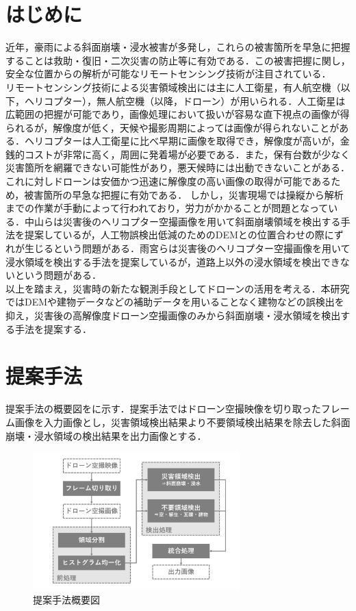 \documentclass[a4paper, twocolumn, xelatex, 8pt, ja=standard, Ligatures=TeX]{bxjsarticle}
\begin{document}
\section{はじめに}
	近年，豪雨による斜面崩壊・浸水被害が多発し，これらの被害箇所を早急に把握することは救助・復旧・二次災害の防止等に有効である．この被害把握に関し，安全な位置からの解析が可能なリモートセンシング技術が注目されている．\\
	\quad リモートセンシング技術による災害領域検出には主に人工衛星，有人航空機（以下，ヘリコプター），無人航空機（以降，ドローン）が用いられる．人工衛星は広範囲の把握が可能であり，画像処理において扱いが容易な直下視点の画像が得られるが，解像度が低く，天候や撮影周期によっては画像が得られないことがある．ヘリコプターは人工衛星に比べ早期に画像を取得でき，解像度が高いが，金銭的コストが非常に高く，周囲に発着場が必要である．また，保有台数が少なく災害箇所を網羅できない可能性があり，悪天候時には出動できないことがある．これに対しドローンは安価かつ迅速に解像度の高い画像の取得が可能であるため，被害箇所の早急な把握に有効である．	しかし，災害現場では操縦から解析までの作業が手動によって行われており，労力がかかることが問題となっている\cite{art00}．中山\cite{art02}らは災害後のヘリコプター空撮画像を用いて斜面崩壊領域を検出する手法を提案しているが，人工物誤検出低減のためのDEMとの位置合わせの際にずれが生じるという問題がある．雨宮\cite{art03}らは災害後のヘリコプター空撮画像を用いて浸水領域を検出する手法を提案しているが，道路上以外の浸水領域を検出できないという問題がある．\\
	\quad 以上を踏まえ，災害時の新たな観測手段としてドローンの活用を考える．本研究ではDEMや建物データなどの補助データを用いることなく建物などの誤検出を抑え，災害後の高解像度ドローン空撮画像のみから斜面崩壊・浸水領域を検出する手法を提案する．

\section{提案手法}
	提案手法の概要図をに示す．提案手法ではドローン空撮映像を切り取ったフレーム画像を入力画像とし，災害領域検出結果より不要領域検出結果を除去した斜面崩壊・浸水領域の検出結果を出力画像とする．
	
\begin{figure}[b]
	\centering
		\includegraphics[width=8cm]{img/howto.jpg}
		\caption{提案手法概要図}
		\label{img01}
\end{figure}
\end{document}

